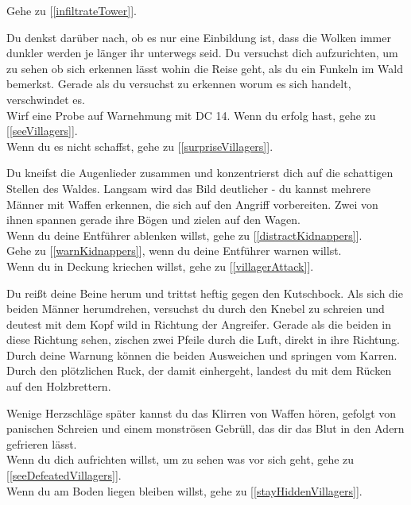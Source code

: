 Gehe zu [\ref{infiltrateTower}].


Du denkst darüber nach, ob es nur eine Einbildung ist, dass die Wolken immer dunkler werden je länger ihr unterwegs seid. Du versuchst dich aufzurichten, um zu sehen ob sich erkennen lässt wohin die Reise geht, als du ein Funkeln im Wald bemerkst. Gerade als du versuchst zu erkennen worum es sich handelt, verschwindet es.
\\Wirf eine Probe auf Warnehmung mit DC 14. Wenn du erfolg hast, gehe zu [\ref{seeVillagers}].
\\Wenn du es nicht schaffst, gehe zu [\ref{surpriseVillagers}].


Du kneifst die Augenlieder zusammen und konzentrierst dich auf die schattigen Stellen des Waldes. Langsam wird das Bild deutlicher - du kannst mehrere Männer mit Waffen erkennen, die sich auf den Angriff vorbereiten. Zwei von ihnen spannen gerade ihre Bögen und zielen auf den Wagen.
\\Wenn du deine Entführer ablenken willst, gehe zu [\ref{distractKidnappers}].
\\Gehe zu [\ref{warnKidnappers}], wenn du deine Entführer warnen willst.
\\Wenn du in Deckung kriechen willst, gehe zu [\ref{villagerAttack}].


Du reißt deine Beine herum und trittst heftig gegen den Kutschbock. Als sich die beiden Männer herumdrehen, versuchst du durch den Knebel zu schreien und deutest mit dem Kopf wild in Richtung der Angreifer. Gerade als die beiden in diese Richtung sehen, zischen zwei Pfeile durch die Luft, direkt in ihre Richtung. Durch deine Warnung können die beiden Ausweichen und springen vom Karren. Durch den plötzlichen Ruck, der damit einhergeht, landest du mit dem Rücken auf den Holzbrettern.

Wenige Herzschläge später kannst du das Klirren von Waffen hören, gefolgt von panischen Schreien und einem monströsen Gebrüll, das dir das Blut in den Adern gefrieren lässt.
\\Wenn du dich aufrichten willst, um zu sehen was vor sich geht, gehe zu [\ref{seeDefeatedVillagers}].
\\Wenn du am Boden liegen bleiben willst, gehe zu [\ref{stayHiddenVillagers}].

